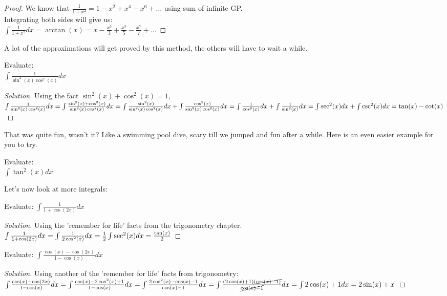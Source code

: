 \begin{proof}
    We know that $\frac{1}{1+x^2}=1-x^2+x^4-x^6+\dots$ using sum of infinite GP.\\
    Integrating both sides will give us:\\
    $\int \frac{1}{1+x^2} dx = \arctan(x)=x-\frac{x^3}{3}+\frac{x^5}{5}-\frac{x^7}{7}+\dots$
\end{proof}
A lot of the approximations will get proved by this method, the others will have to wait a while.\\
\begin{example}
    Evaluate:\\
    $\int \frac{1}{\sin^2(x)\cos^2(x)}dx$
\end{example}
\begin{proof}
[Solution]
    Using the fact $\sin^2(x)+\cos^2(x)=1$,\\
    $\int \frac{1}{\sin^2(x)\cos^2(x)}dx\\
    = \int \frac{\sin^2(x)+\cos^2(x)}{\sin^2(x)\cos^2(x)}dx 
    = \int \frac{\sin^2(x)}{\sin^2(x)\cos^2(x)}dx + \int \frac{\cos^2(x)}{\sin^2(x)\cos^2(x)}dx
    = \int \frac{1}{\cos^2(x)}dx + \int \frac{1}{\sin^2(x)}dx
    = \int \sec^2(x)dx + \int \csc^2(x)dx
    = \tan(x) - \cot(x)$
\end{proof}
That was quite fun, wasn't it? Like a swimming pool dive, scary till we jumped and fun after a while. Here is an even easier example for you to try. 
\begin{example}
    Evaluate:\\
    $\int \tan^2(x)dx$
\end{example}
Let's now look at more integrals:\\
\begin{example}
    Evaluate:
    $\int \frac{1}{1+\cos(2x)} dx$
\end{example}
\begin{proof}
    [Solution]
    Using the 'remember for life' facts from the trigonometry chapter.\\
    $\int \frac{1}{1+\cos(2x)} dx\\
    =\int \frac{1}{2\cos^2(x)} dx\\
    =\frac{1}{2} \int \sec^2(x) dx\\
    =\frac{\tan(x)}{2}$
\end{proof}
\begin{example}
    Evaluate:
    $\int \frac{\cos(x)-\cos(2x)}{1-\cos(x)} dx$
\end{example}
\begin{proof}
    [Solution]
    Using another of the 'remember for life' facts from trigonometry:\\
    $
    \int \frac{\cos(x)-\cos(2x)}{1-\cos(x)} dx\\
    = \int \frac{\cos(x)-2\cos^2(x)+1}{1-\cos(x)} dx\\
    = \int \frac{2\cos^2(x)-\cos(x)-1}{\cos(x)-1} dx\\
    = \int \frac{(2\cos(x)+1)\cancel{(\cos(x)-1)}}{\cancel{\cos(x)-1}} dx\\
    = \int 2\cos(x)+1 dx \\
    = 2\sin(x)+x
    $
\end{proof}
